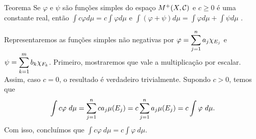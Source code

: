 \begin{env}{Teorema}
	\label{teo:aritmetica-com-integrais-de-funções-simples}
    Se $\varphi$ e $\psi$ são funções simples do espaço $M^+(X,\operatorname{\mathcal{C}})$ e $c\geq0$ é uma constante real, então
    $
    \displaystyle \int c\varphi d\mu = c \int \varphi d\mu
    $
	e
    $
    \displaystyle \int (\varphi + \psi) d\mu = \int \varphi d\mu + \int \psi d\mu
    $ \cite{bartle}.
\end{env}
\begin{prova}
    Representaremos as funções simples não negativas por $\varphi = \displaystyle \sum_{j = 1}^n a_j\chi_{E_j}$ e $\psi = \displaystyle \sum_{k = 1}^m b_k\chi_{F_k}$.
    Primeiro, mostraremos que vale a multiplicação por escalar.
    Assim, caso $c = 0$, o resultado é verdadeiro trivialmente. 
    Supondo $c> 0$, temos que
    $$\int c \varphi\ d\mu = \dsum_{j = 1}^n c a_j\mu(E_j) = c \dsum_{j = 1}^n a_j\mu(E_j) = c\int \varphi \ d\mu.$$
    Com isso, concluímos que $\displaystyle \int c \varphi\ d\mu = c\int \varphi \ d\mu.$ 
 	

\end{prova}
